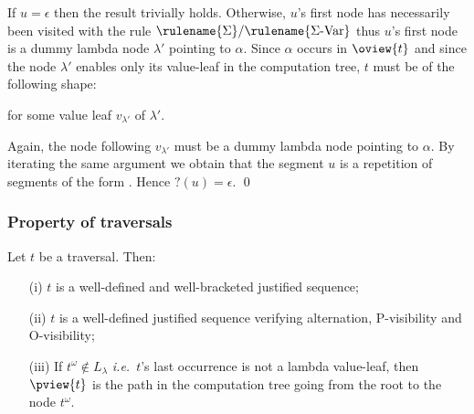 If $u=\epsilon$  then the result trivially holds. Otherwise, $u$'s
first node has necessarily been visited with the rule
$\rulename{\Sigma}/\rulename{\Sigma\mbox{-Var}}$ thus $u$'s first
node is a dummy lambda node $\lambda'$ pointing to $\alpha$. Since
$\alpha$ occurs in $\oview{t}$ and since the node $\lambda'$ enables
only its value-leaf in the computation tree, $t$ must be of the
following shape:

\begin{center}
\ifLoadPGFengine
{}
\else
{}
\fi
\end{center}


for some value leaf $v_{\lambda'}$ of $\lambda'$.

Again, the node following $v_{\lambda'}$ must be a dummy lambda node
pointing to $\alpha$. By iterating the same argument we obtain that
the segment $u$ is a repetition of segments of the form
.
Hence $?(u)=\epsilon$. \qed



\subsubsection{Property of traversals}

\begin{proposition}
\label{prop:pviewtrav_is_path}
Let $t$ be a traversal. Then:
\begin{itemize}
\item[(i)] $t$ is a well-defined and well-bracketed justified sequence;
\item[(ii)] $t$ is a well-defined justified sequence verifying alternation, P-visibility and O-visibility;
\item[(iii)] If $t^\omega \not\in L_\lambda$ {\it i.e.}~$t$'s last occurrence is not a lambda value-leaf, then $\pview{t}$ is the path in the computation tree going from the root to the node $t^\omega$.
\end{itemize}
\end{proposition}

